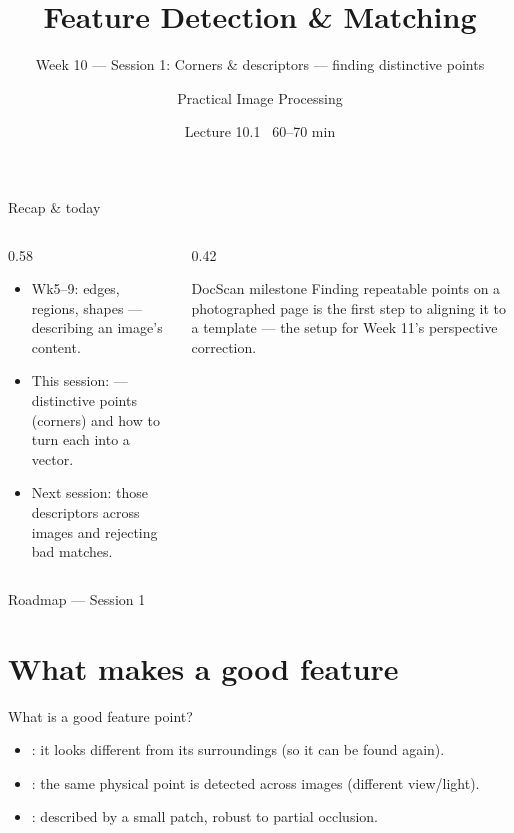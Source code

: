 \documentclass[10pt,aspectratio=169]{beamer}
\title{Feature Detection \& Matching}
\subtitle{Week 10 — Session 1: Corners \& descriptors — finding distinctive points}
\author{Practical Image Processing}
\date{Lecture 10.1 \textbullet\ 60--70 min}
\begin{document}
\maketitle

\begin{frame}{Recap \& today}
  \begin{columns}[T]
    \begin{column}{0.58\textwidth}
      \begin{itemize}
        \item Wk5--9: edges, regions, shapes — describing an image's content.
        \item \alert{This session:}  — distinctive points (corners) and how to
              turn each into a  vector.
        \item Next session:  those descriptors across images and rejecting bad matches.
      \end{itemize}
    \end{column}
    \begin{column}{0.42\textwidth}
      \begin{alertblock}{DocScan milestone}
        Finding repeatable points on a photographed page is the first step to aligning it to a
        template — the setup for Week 11's perspective correction.
      \end{alertblock}
    \end{column}
  \end{columns}
\end{frame}

\begin{frame}{Roadmap — Session 1}\tableofcontents\end{frame}

\section{What makes a good feature}

\begin{frame}{What is a good feature point?}
  \begin{itemize}
    \item {}: it looks different from its surroundings (so it can be found again).
    \item {}: the same physical point is detected across images (different view/light).
    \item {}: described by a small patch, robust to partial occlusion.
  \end{itemize}
\end{frame}
\end{document}
